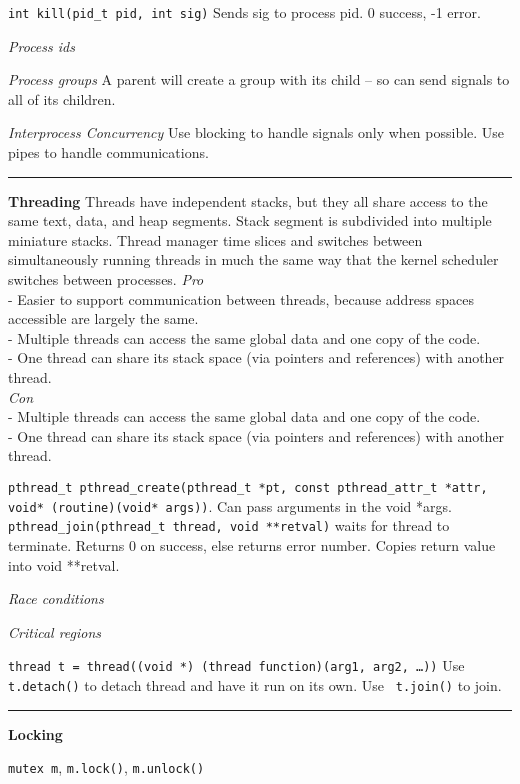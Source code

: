 \documentclass{article}
\begin{document}
\begin{multicols}{3}
  {\tt int kill(pid\_t pid, int sig)} Sends sig to process pid. 0 success, -1
  error.

  {\it Process ids} %

  {\it Process groups} A parent will create a group with its child -- so can
  send signals to all of its children.

  {\it Interprocess Concurrency} Use blocking to handle signals only when
  possible. Use pipes to handle communications.

  \noindent\rule{4cm}{0.4pt}

  {\bf Threading}
  Threads have independent stacks, but they all share access to the same text,
  data, and heap segments. Stack segment is subdivided into multiple miniature
  stacks. Thread manager time slices and switches between simultaneously running
  threads in much the same way that the kernel scheduler switches between
  processes.
  {\it Pro}\\
  - Easier to support communication between threads, because address spaces
  accessible are largely the same.\\
  - Multiple threads can access the same global data and one copy of the code.\\
  - One thread can share its stack space (via pointers and references) with
  another thread.\\
  {\it Con}\\
  - Multiple threads can access the same global data and one copy of the code.\\
  - One thread can share its stack space (via pointers and references) with
  another thread.

  {\tt pthread\_t pthread\_create(pthread\_t *pt, const pthread\_attr\_t *attr,
  void* (routine)(void* args))}. Can pass arguments in the void *args.\\
  {\tt pthread\_join(pthread\_t thread, void **retval)} waits for thread to
  terminate. Returns 0 on success, else returns error number. Copies return
  value into void **retval.

  {\it Race conditions}

  {\it Critical regions}

  {\tt thread t = thread((void *) (thread function)(arg1, arg2, \ldots))} Use
  {\tt t.detach()} to detach thread and have it run on its own. Use {\tt
  t.join()} to join.

  \noindent\rule{4cm}{0.4pt}

  {\bf Locking}

  {\tt mutex m}, {\tt m.lock()}, {\tt m.unlock()}


\end{multicols}
\end{document}
